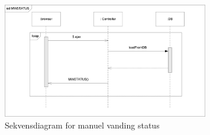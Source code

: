 \begin{figure}[H]
    \centering
    \includegraphics[width=0.8\textwidth]{SoftwareArkitektur/GUI/Controller/photo/sd_mwstatus.PNG}
    \caption{Sekvensdiagram for manuel vanding status}
    \label{fig:knap}
\end{figure}



